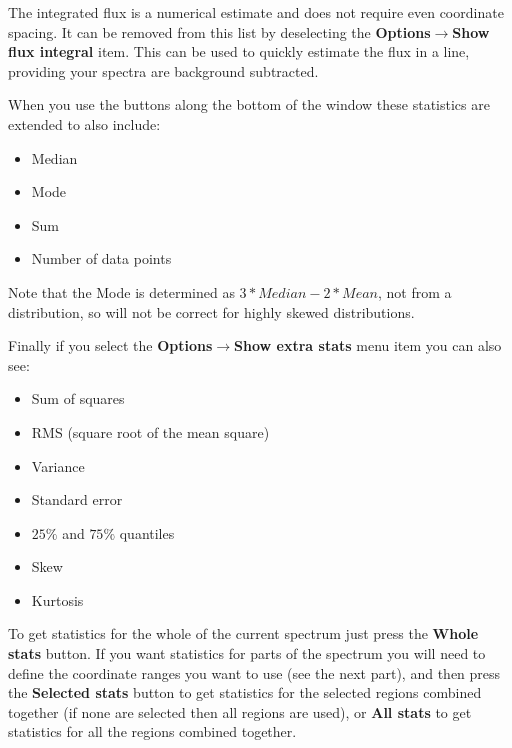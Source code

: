 \documentclass[twoside,11pt]{article}
\newcommand{\latexhtml}[2]{#1}
\renewcommand{\_}{\texttt{\symbol{95}}}
\newcommand{\submenuitem}[2]{\latexhtml{\textbf{#1$\rightarrow$#2}}{\textbf{#1->#2}}}
\newcommand{\labelitem}[1]{\textbf{#1}}
\begin{document}
The integrated flux is a numerical estimate and does not require
even coordinate spacing.
It can be removed from this list by deselecting the
\submenuitem{Options}{Show flux integral} item. This can be used to quickly
estimate the flux in a line, providing your spectra are background
subtracted. 

When you use the buttons along the bottom of the window these statistics are
extended to also include:
\begin{itemize}
\item Median
\item Mode
\item Sum
\item Number of data points
\end{itemize}
Note that the Mode is determined as $3*Median-2*Mean$, not from a
distribution, so will not be correct for highly skewed distributions.

Finally if you select the \submenuitem{Options}{Show extra stats} menu item
you can also see:
\begin{itemize}
\item Sum of squares
\item RMS (square root of the mean square)
\item Variance
\item Standard error
\item $25\%$ and $75\%$ quantiles
\item Skew
\item Kurtosis
\end{itemize}

To get statistics for the whole of the current spectrum just press the
\labelitem{Whole stats} button. If you want statistics for parts of the
spectrum you will need to define the coordinate ranges you want to use (see
the next part), and then press the \labelitem{Selected stats} button to get
statistics for the selected regions combined together (if none are selected
then all regions are used), or \labelitem{All stats} to get statistics for all
the regions combined together.
\end{document}
